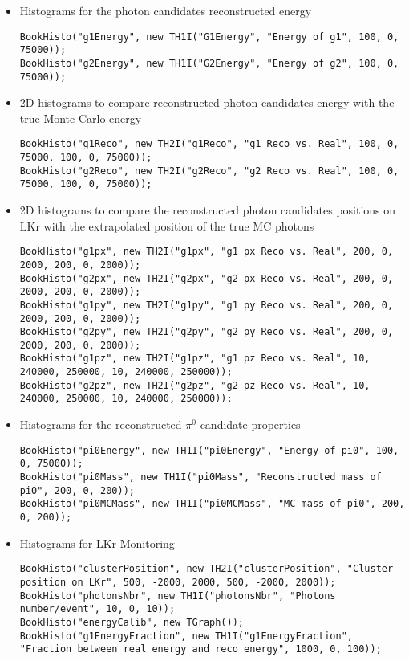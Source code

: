 \begin{itemize}
  \item Histograms for the photon candidates reconstructed energy 
\begin{lstlisting}
BookHisto("g1Energy", new TH1I("G1Energy", "Energy of g1", 100, 0, 75000));
BookHisto("g2Energy", new TH1I("G2Energy", "Energy of g2", 100, 0, 75000));
\end{lstlisting}
	\item 2D histograms to compare reconstructed photon candidates energy with the true Monte Carlo
	energy
\begin{lstlisting}
BookHisto("g1Reco", new TH2I("g1Reco", "g1 Reco vs. Real", 100, 0, 75000, 100, 0, 75000));
BookHisto("g2Reco", new TH2I("g2Reco", "g2 Reco vs. Real", 100, 0, 75000, 100, 0, 75000));
\end{lstlisting}
	\item 2D histograms to compare the reconstructed photon candidates positions on LKr with the
	extrapolated position of the true MC photons
\begin{lstlisting}
BookHisto("g1px", new TH2I("g1px", "g1 px Reco vs. Real", 200, 0, 2000, 200, 0, 2000));
BookHisto("g2px", new TH2I("g2px", "g2 px Reco vs. Real", 200, 0, 2000, 200, 0, 2000));
BookHisto("g1py", new TH2I("g1py", "g1 py Reco vs. Real", 200, 0, 2000, 200, 0, 2000));
BookHisto("g2py", new TH2I("g2py", "g2 py Reco vs. Real", 200, 0, 2000, 200, 0, 2000));
BookHisto("g1pz", new TH2I("g1pz", "g1 pz Reco vs. Real", 10, 240000, 250000, 10, 240000, 250000));
BookHisto("g2pz", new TH2I("g2pz", "g2 pz Reco vs. Real", 10, 240000, 250000, 10, 240000, 250000));
\end{lstlisting}
	\item Histograms for the reconstructed $\pi^0$ candidate properties
\begin{lstlisting}
BookHisto("pi0Energy", new TH1I("pi0Energy", "Energy of pi0", 100, 0, 75000));
BookHisto("pi0Mass", new TH1I("pi0Mass", "Reconstructed mass of pi0", 200, 0, 200));
BookHisto("pi0MCMass", new TH1I("pi0MCMass", "MC mass of pi0", 200, 0, 200));
\end{lstlisting}
	\item Histograms for LKr Monitoring
\begin{lstlisting}
BookHisto("clusterPosition", new TH2I("clusterPosition", "Cluster position on LKr", 500, -2000, 2000, 500, -2000, 2000));
BookHisto("photonsNbr", new TH1I("photonsNbr", "Photons number/event", 10, 0, 10));
BookHisto("energyCalib", new TGraph());
BookHisto("g1EnergyFraction", new TH1I("g1EnergyFraction", "Fraction between real energy and reco energy", 1000, 0, 100));

\end{lstlisting}
\end{itemize}

